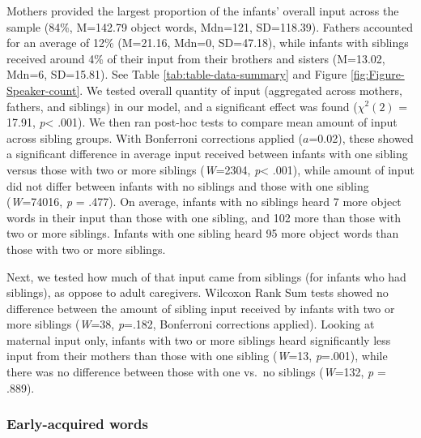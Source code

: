 \documentclass[man,floatsintext]{apa6}
\begin{document}
Mothers provided the largest proportion of the infants' overall input across the sample (84\%, M=142.79 object words, Mdn=121, SD=118.39). Fathers accounted for an average of 12\% (M=21.16, Mdn=0, SD=47.18), while infants with siblings received around 4\% of their input from their brothers and sisters (M=13.02, Mdn=6, SD=15.81). See Table \ref{tab:table-data-summary} and Figure \ref{fig:Figure-Speaker-count}. We tested overall quantity of input (aggregated across mothers, fathers, and siblings) in our model, and a significant effect was found (\(\chi^2 (2)\) = 17.91, \emph{p}\textless{} .001). We then ran post-hoc tests to compare mean amount of input across sibling groups. With Bonferroni corrections applied (\(a\)=0.02), these showed a significant difference in average input received between infants with one sibling versus those with two or more siblings (\emph{W}=2304, \emph{p}\textless{} .001), while amount of input did not differ between infants with no siblings and those with one sibling (\emph{W}=74016, \emph{p} = .477). On average, infants with no siblings heard 7 more object words in their input than those with one sibling, and 102 more than those with two or more siblings. Infants with one sibling heard 95 more object words than those with two or more siblings.

Next, we tested how much of that input came from siblings (for infants who had siblings), as oppose to adult caregivers. Wilcoxon Rank Sum tests showed no difference between the amount of sibling input received by infants with two or more siblings (\emph{W}=38, \emph{p}=.182, Bonferroni corrections applied). Looking at maternal input only, infants with two or more siblings heard significantly less input from their mothers than those with one sibling (\emph{W}=13, \emph{p}=.001), while there was no difference between those with one vs.~no siblings (\emph{W}=132, \emph{p} = .889).

\hypertarget{early-acquired-words}{%
\subsubsection{Early-acquired words}\label{early-acquired-words}}
\end{document}
